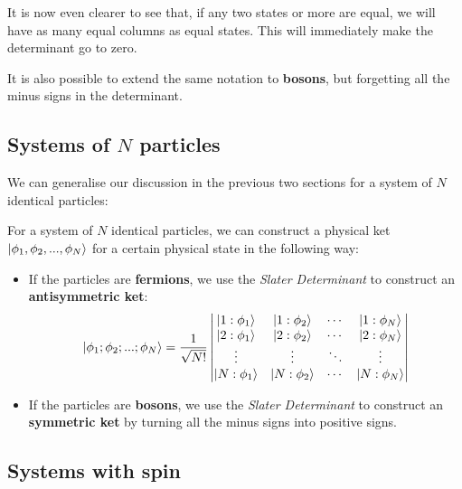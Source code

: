 It is now even clearer to see that, if any two states or more are equal, we will have as many equal columns as equal states. This will immediately make the determinant go to zero.

It is also possible to extend the same notation to \textbf{bosons}, but forgetting all the minus signs in the determinant.

\subsection{Systems of $N$ particles}

We can generalise our discussion in the previous two sections for a system of $N$ identical particles:

\begin{definition}
    For a system of $N$ identical particles, we can construct a physical ket $\ket{\phi_1,\phi_2,...,\phi_N}$ for a certain physical state in the following way:
    \begin{itemize}
        \item If the particles are \textbf{fermions}, we use the \textit{Slater Determinant} to construct an \textbf{antisymmetric ket}:
        \begin{equation}
            \ket{\phi_1;\phi_2;...;\phi_N} = \frac{1}{\sqrt{N!}}\left|\begin{matrix}
                \ket{1:\phi_1} & \ket{1:\phi_2} & \cdots & \ket{1:\phi_N}\\
                \ket{2:\phi_1} & \ket{2:\phi_2} & \cdots & \ket{2:\phi_N}\\
                \vdots & \vdots & \ddots & \vdots \\
                \ket{N:\phi_1} & \ket{N:\phi_2} & \cdots & \ket{N:\phi_N}\\
            \end{matrix}\right|
        \end{equation}
        \item If the particles are \textbf{bosons}, we use the \textit{Slater Determinant} to construct an \textbf{symmetric ket} by turning all the minus signs into positive signs.
    \end{itemize}
\end{definition}

\subsection{Systems with spin}

